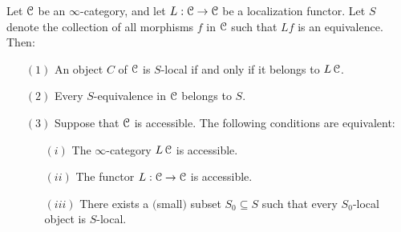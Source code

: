 \begin{proposition}\label{localloc}
Let $\operatorname{\mathcal{C}}$ be an $\infty$-category, and let $L: \operatorname{\mathcal{C}} \rightarrow \operatorname{\mathcal{C}}$ be a localization functor.
Let $S$ denote the collection of all morphisms $f$ in $\operatorname{\mathcal{C}}$ such that $Lf$ is an equivalence.
Then:
\begin{itemize}
\item[$(1)$] An object $C$ of $\operatorname{\mathcal{C}}$ is $S$-local if and only if it belongs to $L\operatorname{\mathcal{C}}$.
\item[$(2)$] Every $S$-equivalence in $\operatorname{\mathcal{C}}$ belongs to $S$.
\item[$(3)$] Suppose that $\operatorname{\mathcal{C}}$ is accessible. The following conditions are equivalent:
\begin{itemize}
\item[$(i)$] The $\infty$-category $L \operatorname{\mathcal{C}}$ is accessible.
\item[$(ii)$] The functor $L: \operatorname{\mathcal{C}} \rightarrow \operatorname{\mathcal{C}}$ is accessible.
\item[$(iii)$] There exists a $($small$)$ subset $S_0 \subseteq S$ such that every $S_0$-local object is $S$-local. 

\end{itemize}

\end{itemize}

\end{proposition}

